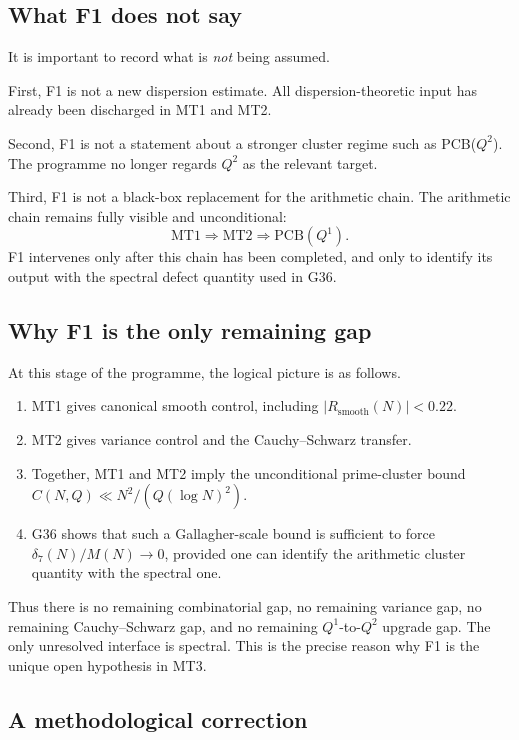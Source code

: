 \documentclass[11pt,a4paper]{article}
\begin{document}
\subsection{What F1 does not say}

It is important to record what is \emph{not} being assumed.

First, F1 is not a new dispersion estimate. All dispersion-theoretic input has already been discharged in MT1 and MT2.

Second, F1 is not a statement about a stronger cluster regime such as PCB($Q^2$). The programme no longer regards $Q^2$ as the relevant target.

Third, F1 is not a black-box replacement for the arithmetic chain. The arithmetic chain remains fully visible and unconditional:
\[
\text{MT1} \Longrightarrow \text{MT2} \Longrightarrow \text{PCB}(Q^1).
\]
F1 intervenes only after this chain has been completed, and only to identify its output with the spectral defect quantity used in G36.

\subsection{Why F1 is the only remaining gap}

At this stage of the programme, the logical picture is as follows.

\begin{enumerate}
    \item MT1 gives canonical smooth control, including $|R_{\mathrm{smooth}}(N)| < 0.22$.
    \item MT2 gives variance control and the Cauchy--Schwarz transfer.
    \item Together, MT1 and MT2 imply the unconditional prime-cluster bound $C(N,Q) \ll N^2/(Q(\log N)^2)$.
    \item G36 shows that such a Gallagher-scale bound is sufficient to force $\delta_7(N)/M(N) \to 0$, provided one can identify the arithmetic cluster quantity with the spectral one.
\end{enumerate}

Thus there is no remaining combinatorial gap, no remaining variance gap, no remaining Cauchy--Schwarz gap, and no remaining $Q^1$-to-$Q^2$ upgrade gap. The only unresolved interface is spectral. This is the precise reason why F1 is the unique open hypothesis in MT3.

\subsection{A methodological correction}
\end{document}
